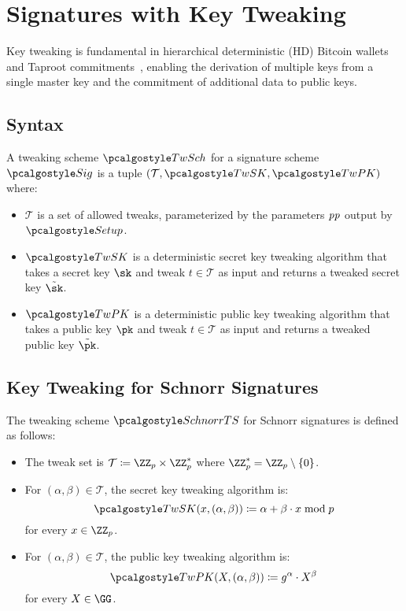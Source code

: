 \section{Signatures with Key Tweaking}\label{sec:signatures-key-tweaking}

Key tweaking is fundamental in hierarchical deterministic (HD) Bitcoin wallets~\cite{add:bip-hdwallets} and Taproot commitments~\cite{add:bip-taproot}, enabling the derivation of multiple keys from a single master key and the commitment of additional data to public keys.

\subsection{Syntax}

\begin{definition}
  A tweaking scheme $\algo{TwSch}$ for a signature scheme $\algo{Sig}$ is a tuple $(\mathcal{T}, \algo{TwSK}, \algo{TwPK})$ where:
  \begin{itemize}
    \item $\mathcal{T}$ is a set of allowed tweaks, parameterized by the parameters $\mathit{pp}$ output by $\algo{Setup}$.
    \item $\algo{TwSK}$ is a deterministic secret key tweaking algorithm that takes a secret key $\sk$ and tweak $t \in \mathcal{T}$ as input and returns a tweaked secret key $\tilde{\sk}$.
    \item $\algo{TwPK}$ is a deterministic public key tweaking algorithm that takes a public key $\pk$ and tweak $t \in \mathcal{T}$ as input and returns a tweaked public key $\tilde{\pk}$.
  \end{itemize}
\end{definition}

\subsection{Key Tweaking for Schnorr Signatures}

\begin{definition}[SchnorrTS]\label{def:schnorrts}
  The tweaking scheme $\algo{SchnorrTS}$ for Schnorr signatures is defined as follows:
  \begin{itemize}
    \item The tweak set is $\mathcal{T} \defeq \ZZ_p \times \ZZ_p^*$ where $\ZZ_p^* = \ZZ_p \setminus \{0\}$.
    \item For $(\alpha, \beta) \in \mathcal{T}$, the secret key tweaking algorithm is:
    \[
      \algo{TwSK}(x, (\alpha, \beta)) \defeq \alpha + \beta \cdot x \bmod p
    \]
    for every $x \in \ZZ_p$.
    \item For $(\alpha, \beta) \in \mathcal{T}$, the public key tweaking algorithm is:
    \[
      \algo{TwPK}(X, (\alpha, \beta)) \defeq g^\alpha \cdot X^\beta
    \]
    for every $X \in \GG$.
  \end{itemize}
\end{definition}

